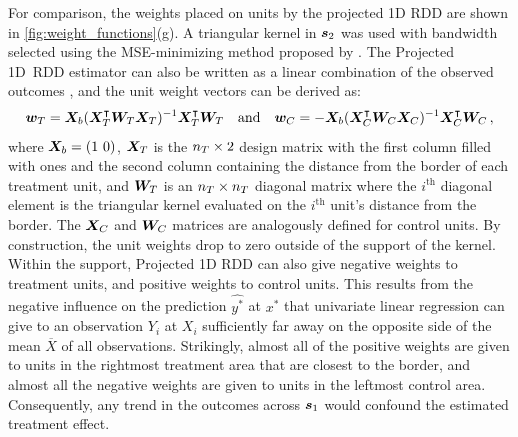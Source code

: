     For comparison, the weights placed on units by the projected 1D RDD are shown in \autoref{fig:weight_functions}(g).
A triangular kernel in \(\bm{s}_2\) was used with bandwidth selected using the MSE-minimizing method proposed by \cite{imbens2012optimal}.
The Projected 1D~RDD estimator can also be written as a linear combination of the observed outcomes , and the unit weight vectors can be derived as:
\begin{equation}
\wt = \Xmat_b (\Xmat_\treat\trans \Wmat_\treat \Xmat_\treat)^{-1} \Xmat_\treat\trans \Wmat_\treat %
\quad\text{and}\quad
\wc = - \Xmat_b (\Xmat_\ctrol\trans \Wmat_\ctrol \Xmat_\ctrol)^{-1} \Xmat_\ctrol\trans \Wmat_\ctrol \,,
\label{eq:unit_weights_llr}
\end{equation}
where \(\bm{X}_b = \left\lparen1~0\right\rparen\), \(\bm{X}_T\) is the \(n_T \times 2\) design matrix with the first column filled with ones and the second column containing the distance from the border of each treatment unit, and \(\bm{W}_T\) is an \(n_T \times n_T\) diagonal matrix where the \(i^\mathrm{th}\) diagonal element is the triangular kernel evaluated on the \(i^\mathrm{th}\) unit's distance from the border.
The \(\bm{X}_C\) and \(\bm{W}_C\) matrices are analogously defined for control units.
By construction, the unit weights drop to zero outside of the support of the kernel.
Within the support, Projected 1D RDD can also give negative weights to treatment units, and positive weights to control units.
This results from the negative influence on the prediction \(\widehat{y^*}\) at \(x^*\) that univariate linear regression can give to an observation \(Y_i\) at \(X_i\) sufficiently far away on the opposite side of the mean \(\overline{X}\) of all observations.
Strikingly, almost all of the positive weights are given to units in the rightmost treatment area that are closest to the border, and almost all the negative weights are given to units in the leftmost control area.
Consequently, any trend in the outcomes across \(\bm{s}_1\) would confound the estimated treatment effect.

